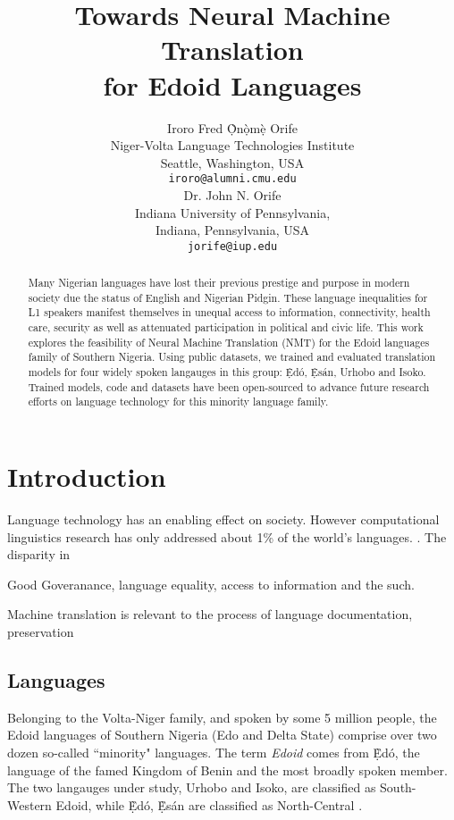 \documentclass{article} %
\title{Towards Neural Machine Translation \\ for Edoid Languages}
\author{Iroro Fred \d{\`O}n\d{\`o}m\d{\`e} Orife \\
Niger-Volta Language Technologies Institute\\
Seattle, Washington, USA \\
\texttt{iroro@alumni.cmu.edu} \\
\And
Dr. John N. Orife\\
Indiana University of Pennsylvania, \\
Indiana, Pennsylvania, USA \\
\texttt{jorife@iup.edu} \\
}
\begin{document}
\maketitle

\begin{abstract}
Many Nigerian languages have lost their previous prestige and purpose in modern society due the status of English and Nigerian Pidgin. These language inequalities for L1 speakers manifest themselves in unequal access to information, connectivity, health care, security as well as attenuated participation in political and civic life. This work explores the feasibility of Neural Machine Translation (NMT) for the Edoid languages family of Southern Nigeria. Using public datasets, we trained and evaluated translation models for four widely spoken langauges in this group: \d{\`E}d{\'o}, \d{\`E}s{\'a}n, Urhobo and Isoko. Trained models, code and datasets have been open-sourced to advance future research efforts on language technology for this minority language family.\\


\end{abstract}

\section{Introduction}
Language technology has an enabling effect on society. However computational linguistics research has only addressed about 1\% of the world's languages. \citep{bird2012machine}. The disparity in 

\citep{odoje201612}

Good Goveranance, language equality, access to information and the such.

Machine translation  is relevant to the process of language documentation, preservation

\subsection{Languages}
Belonging to the Volta-Niger family, and spoken by some 5 million people, the Edoid languages of Southern Nigeria (Edo and Delta State) comprise over two dozen so-called ``minority" languages. The term \emph{Edoid} comes from \d{\`E}d{\'o}, the language of the famed Kingdom of Benin and the most broadly spoken member. The two langauges under study, Urhobo and Isoko, are classified as South-Western Edoid, while \d{\`E}d{\'o}, \d{\`E}s{\'a}n are classified as North-Central \citep{wikiedoid}.
\end{document}
